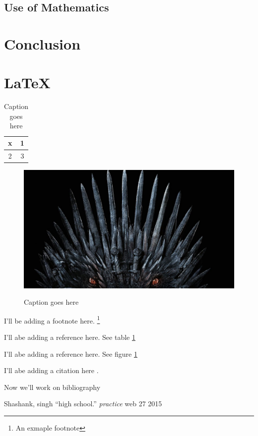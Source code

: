 \documentclass[11pt]{article}
\begin{document}
\subsection{Use of Mathematics}
\section{Conclusion}
\section{\LaTeX}

\begin{table}[H]
\centering
\begin{tabular}{|c|c|}\hline
x & 1 \\ \hline
2 & 3\\ \hline

\end{tabular}
\label{tab:data1}
\caption{Caption goes here}
\end{table}

\begin{figure}[H]
\centering
\includegraphics[scale=0.25]{iron_throne}
\label{fig:data2}
\caption{Caption goes here}


\end{figure}
I'll be adding a footnote here. \footnote{An exmaple footnote}

I'll abe adding a reference here. See table \ref{tab:data1}

I'll abe adding a reference here. See figure \ref{fig:data2}

I'll abe adding a citation here \cite{first}.

\pagebreak



Now we'll work on bibliography


\begin{thebibliography}	
Shashank, singh
``high school.''
\textit{practice}
web 27 2015

\end{thebibliography}
\end{document}
